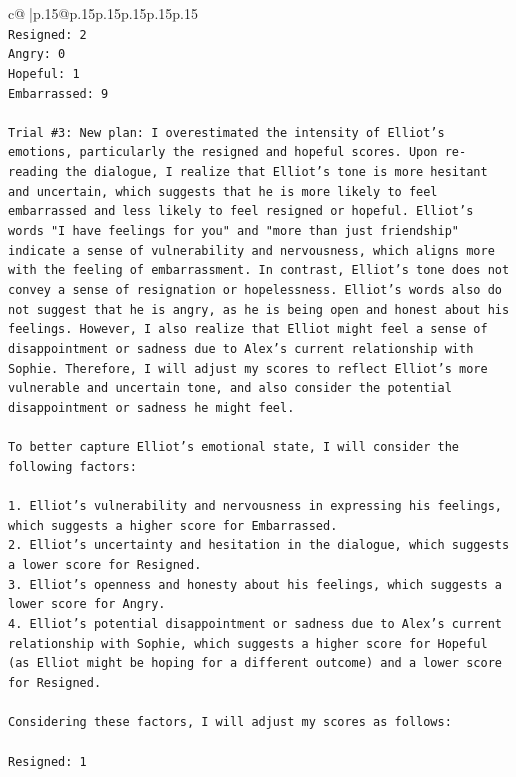 \documentclass{article}
\begin{document}
{\begin{supertabular}{c@{$\;$}|p{.15\linewidth}@{}p{.15\linewidth}p{.15\linewidth}p{.15\linewidth}p{.15\linewidth}p{.15\linewidth}}
{{{\\ 
\texttt{Resigned: 2} \\
\texttt{Angry: 0} \\
\texttt{Hopeful: 1} \\
\texttt{Embarrassed: 9} \\
\\ 
\texttt{Trial \#3: New plan: I overestimated the intensity of Elliot's emotions, particularly the resigned and hopeful scores. Upon re{-}reading the dialogue, I realize that Elliot's tone is more hesitant and uncertain, which suggests that he is more likely to feel embarrassed and less likely to feel resigned or hopeful. Elliot's words "I have feelings for you" and "more than just friendship" indicate a sense of vulnerability and nervousness, which aligns more with the feeling of embarrassment. In contrast, Elliot's tone does not convey a sense of resignation or hopelessness. Elliot's words also do not suggest that he is angry, as he is being open and honest about his feelings. However, I also realize that Elliot might feel a sense of disappointment or sadness due to Alex's current relationship with Sophie. Therefore, I will adjust my scores to reflect Elliot's more vulnerable and uncertain tone, and also consider the potential disappointment or sadness he might feel. } \\
\\ 
\texttt{To better capture Elliot's emotional state, I will consider the following factors:} \\
\\ 
\texttt{1. Elliot's vulnerability and nervousness in expressing his feelings, which suggests a higher score for Embarrassed.} \\
\texttt{2. Elliot's uncertainty and hesitation in the dialogue, which suggests a lower score for Resigned.} \\
\texttt{3. Elliot's openness and honesty about his feelings, which suggests a lower score for Angry.} \\
\texttt{4. Elliot's potential disappointment or sadness due to Alex's current relationship with Sophie, which suggests a higher score for Hopeful (as Elliot might be hoping for a different outcome) and a lower score for Resigned.} \\
\\ 
\texttt{Considering these factors, I will adjust my scores as follows:} \\
\\ 
\texttt{Resigned: 1} \\
}}}
\end{supertabular}}
\end{document}
